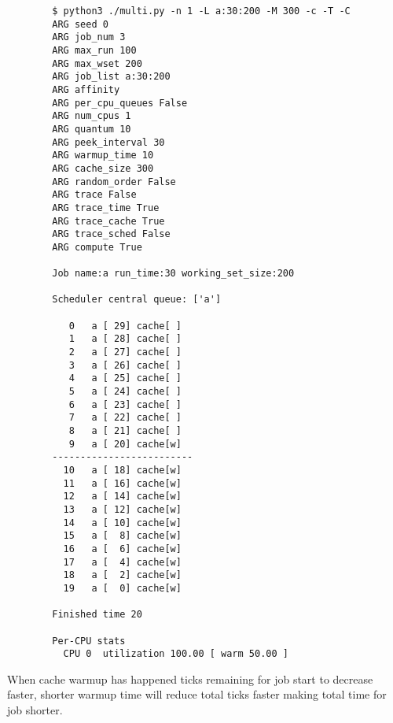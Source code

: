 \documentclass{article}
\begin{document}
\begin{enumerate}[label=\textbf{\arabic*}), start=1]
    {\scriptsize
    \begin{verbatim}
        $ python3 ./multi.py -n 1 -L a:30:200 -M 300 -c -T -C
        ARG seed 0
        ARG job_num 3
        ARG max_run 100
        ARG max_wset 200
        ARG job_list a:30:200
        ARG affinity 
        ARG per_cpu_queues False
        ARG num_cpus 1
        ARG quantum 10
        ARG peek_interval 30
        ARG warmup_time 10
        ARG cache_size 300
        ARG random_order False
        ARG trace False
        ARG trace_time True
        ARG trace_cache True
        ARG trace_sched False
        ARG compute True
        
        Job name:a run_time:30 working_set_size:200
        
        Scheduler central queue: ['a']
        
           0   a [ 29] cache[ ]     
           1   a [ 28] cache[ ]     
           2   a [ 27] cache[ ]     
           3   a [ 26] cache[ ]     
           4   a [ 25] cache[ ]     
           5   a [ 24] cache[ ]     
           6   a [ 23] cache[ ]     
           7   a [ 22] cache[ ]     
           8   a [ 21] cache[ ]     
           9   a [ 20] cache[w]     
        -------------------------
          10   a [ 18] cache[w]     
          11   a [ 16] cache[w]     
          12   a [ 14] cache[w]     
          13   a [ 12] cache[w]     
          14   a [ 10] cache[w]     
          15   a [  8] cache[w]     
          16   a [  6] cache[w]     
          17   a [  4] cache[w]     
          18   a [  2] cache[w]     
          19   a [  0] cache[w]     
        
        Finished time 20
        
        Per-CPU stats
          CPU 0  utilization 100.00 [ warm 50.00 ]
    \end{verbatim}
    }
    When cache warmup has happened ticks remaining for job start to
    decrease faster, shorter warmup time will reduce total ticks faster
    making total time for job shorter.
\end{enumerate}

\newpage


\end{document}
